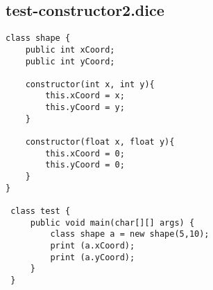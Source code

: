 \subsection{test-constructor2.dice}
\begin{verbatim}
class shape {
	public int xCoord;
	public int yCoord;
	
	constructor(int x, int y){
		this.xCoord = x;
		this.yCoord = y;
	}

	constructor(float x, float y){
		this.xCoord = 0;
		this.yCoord = 0;
	}
}

 class test {
	 public void main(char[][] args) {
		 class shape a = new shape(5,10);
		 print (a.xCoord);
		 print (a.yCoord);
	 }
 }
\end{verbatim}